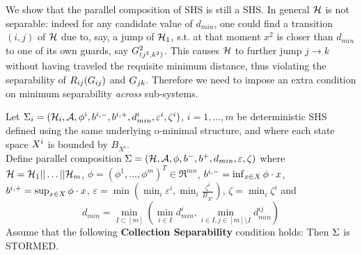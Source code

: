 We show that the parallel composition of SHS is still a SHS.
In general $\mathcal{H}$ is not separable: indeed for any candidate value of $d_{min}$, one could find a transition $(i,j)$ of $\mathcal{H}$ due to, say, a jump of $\mathcal{H}_1$, s.t. at that moment $x^2$ is closer than $d_{min}$ to one of its own guards, say $G^2_{(j^2,k^2)}$. 
This causes $\mathcal{H}$ to further jump $j \rightarrow k$ without having traveled the requisite minimum distance, thus violating the separability of $R_{ij}(G_{ij})$ and $G_{jk}$.
Therefore we need to impose an extra condition on minimum separability \emph{across} sub-systems.
\begin{thm}
	\label{thm:SHS composition}		
	Let $\Sigma_i = (\mathcal{H}_i, \mathcal{A}, \phi^i,b^{i,-},b ^{i,+}, d_{min}^i, \varepsilon^i, \zeta^i)$, $i=1,\ldots,m$ be deterministic SHS 
	defined using the same underlying o-minimal structure, 
	and where each state space $X^i$ is bounded by $B_{X^i}$.
	\\
	Define parallel composition $\Sigma = (\mathcal{H}, \mathcal{A}, \phi,b^-,b^+, d_{min}, \varepsilon, \zeta)$ where
	$\mathcal{H} = \mathcal{H}_1 || \ldots ||\mathcal{H}_m$,	
	$\phi = (\phi^1,\ldots,\phi^m)^T \in \Re^{mn}$,
	$b^{i,-} = \inf_{x \in X} \phi\cdot x$,
	$b^{i,+} = \sup_{x \in X} \phi\cdot x$,
	$\varepsilon = \min(\min_i \varepsilon^i, \min_i \frac{\zeta^i}{B_{X^i}})$,
	$\zeta = \min_i \zeta^i$ and
	\[d_{min} = \min_{I\subset [m]} (\min_{i\in I}d_{min}^i, \min_{i\in I ,j \in [m]\setminus I }d_{min}^{ij})\]	
	Assume that the following \textbf{Collection Separability} condition holds: 	
	Then $\Sigma$ is STORMED.
\end{thm}
